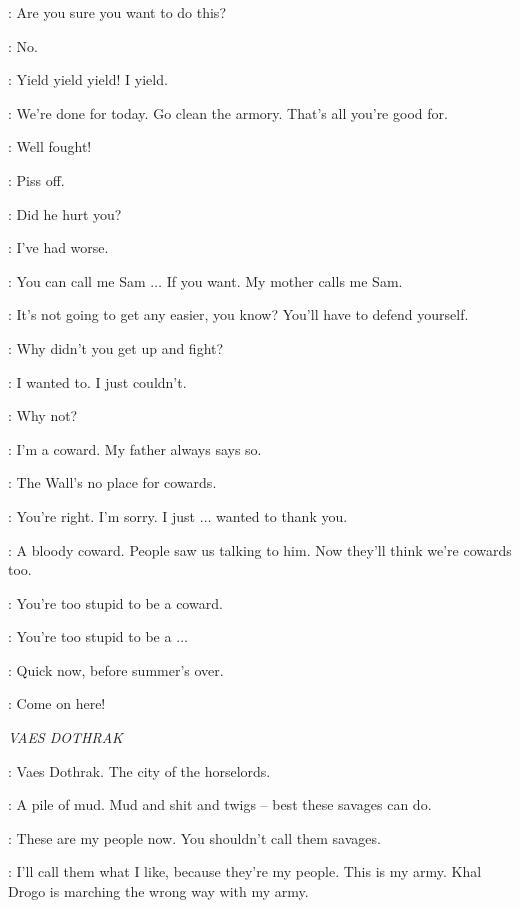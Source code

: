 \JON: Are you sure you want to do this? 

\GRENN: No.


\GRENN: Yield yield yield! I yield. 

\ALLISER: We're done for today. Go clean the armory. That's all you're good for. 

\PYP: Well fought! 

\GRENN: Piss off. 

\SAM:  Did he hurt you? 

\JON: I've had worse. 

\SAM: You can call me Sam $\ldots$ If you want. My mother calls me Sam. 

\JON: It's not going to get any easier, you know? You'll have to defend yourself. 

\GRENN: Why didn't you get up and fight? 

\SAM: I wanted to. I just couldn't. 

\GRENN: Why not? 

\SAM: I'm a coward. My father always says so. 

\JON: The Wall's no place for cowards. 

\SAM: You're right. I'm sorry. I just $\ldots$ wanted to thank you. 

\GRENN: A bloody coward. People saw us talking to him. Now they'll think we're cowards too. 

\PYP: You're too stupid to be a coward. 

\GRENN: You're too stupid to be a $\ldots$ 

\PYP: Quick now, before summer's over. 

\GRENN: Come on here! 


\scene

\textit{VAES DOTHRAK}


\JORAH: Vaes Dothrak. The city of the horselords. 

\VISERYS: A pile of mud. Mud and shit and twigs -- best these savages can do. 

\DAENERYS: These are my people now. You shouldn't call them savages. 

\VISERYS: I'll call them what I like, because they're my people. This is my army. Khal Drogo is marching the wrong way with my army. 

